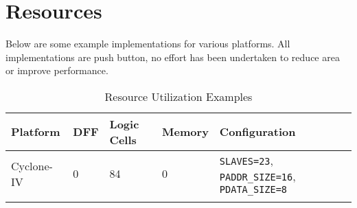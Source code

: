 \chapter{Resources}\label{resources}

Below are some example implementations for various platforms. All implementations are push button, no effort has been undertaken to
reduce area or improve performance.

\begin{longtable}[]{@{}lllll@{}}
	\toprule
	Platform & DFF & Logic Cells & Memory & Configuration\tabularnewline
	\midrule
	\endhead
	\begin{minipage}[t]{0.15\columnwidth}\raggedright\strut
		Cyclone-IV\strut
	\end{minipage} & \begin{minipage}[t]{0.15\columnwidth}\raggedright\strut
		0\strut
	\end{minipage} & \begin{minipage}[t]{0.15\columnwidth}\raggedright\strut
		84\strut
	\end{minipage} & \begin{minipage}[t]{0.15\columnwidth}\raggedright\strut
		0\strut
	\end{minipage} & \begin{minipage}[t]{0.20\columnwidth}\raggedright\strut
		\texttt{SLAVES=23}, 		
		\texttt{PADDR\_SIZE=16}, 		
		\texttt{PDATA\_SIZE=8}\strut
	\end{minipage}\tabularnewline
	\bottomrule
	\caption{Resource Utilization Examples}
\end{longtable}
 